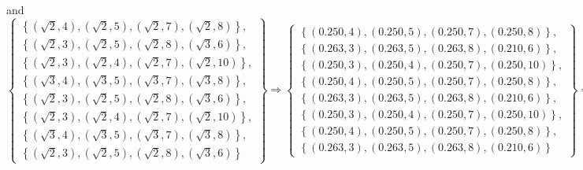 \documentclass{article}[10pt]
\begin{document}
and
\begin{equation}
\left\{\begin{array}{c} 
\left\{\left(\sqrt{2},4\right),\left(\sqrt{2},5\right),\left(\sqrt{2},7\right),\left(\sqrt{2},8\right)\right\},\\
\left\{\left(\sqrt{2},3\right),\left(\sqrt{2},5\right),\left(\sqrt{2},8\right),\left(\sqrt{3},6\right)\right\},\\
\left\{\left(\sqrt{2},3\right),\left(\sqrt{2},4\right),\left(\sqrt{2},7\right),\left(\sqrt{2},10\right)\right\},\\
\left\{\left(\sqrt{3},4\right),\left(\sqrt{3},5\right),\left(\sqrt{3},7\right),\left(\sqrt{3},8\right)\right\},\\
\left\{\left(\sqrt{2},3\right),\left(\sqrt{2},5\right),\left(\sqrt{2},8\right),\left(\sqrt{3},6\right)\right\},\\
\left\{\left(\sqrt{2},3\right),\left(\sqrt{2},4\right),\left(\sqrt{2},7\right),\left(\sqrt{2},10\right)\right\},\\
\left\{\left(\sqrt{3},4\right),\left(\sqrt{3},5\right),\left(\sqrt{3},7\right),\left(\sqrt{3},8\right)\right\},\\
\left\{\left(\sqrt{2},3\right),\left(\sqrt{2},5\right),\left(\sqrt{2},8\right),\left(\sqrt{3},6\right)\right\}
\end{array}\right\}\Longrightarrow
\left\{\begin{array}{c} 
\left\{\left(0.250,4\right),\left(0.250,5\right),\left(0.250,7\right),\left(0.250,8\right)\right\},\\
\left\{\left(0.263,3\right),\left(0.263,5\right),\left(0.263,8\right),\left(0.210,6\right)\right\},\\
\left\{\left(0.250,3\right),\left(0.250,4\right),\left(0.250,7\right),\left(0.250,10\right)\right\},\\
\left\{\left(0.250,4\right),\left(0.250,5\right),\left(0.250,7\right),\left(0.250,8\right)\right\},\\
\left\{\left(0.263,3\right),\left(0.263,5\right),\left(0.263,8\right),\left(0.210,6\right)\right\},\\
\left\{\left(0.250,3\right),\left(0.250,4\right),\left(0.250,7\right),\left(0.250,10\right)\right\},\\
\left\{\left(0.250,4\right),\left(0.250,5\right),\left(0.250,7\right),\left(0.250,8\right)\right\},\\
\left\{\left(0.263,3\right),\left(0.263,5\right),\left(0.263,8\right),\left(0.210,6\right)\right\}
\end{array}\right\} = \left\{w_{t}^Y\right\}_o\;\;,
\end{equation}
\end{document}
